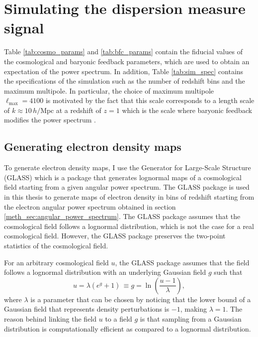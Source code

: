 \section{Simulating the dispersion measure signal} \label{meth_sec:sim_dm}
Table \ref{tab:cosmo_params} and \ref{tab:bfc_params} contain the fiducial values of the cosmological and baryonic feedback parameters, which are used to obtain an expectation of the power spectrum. In addition, Table \ref{tab:sim_spec} contains the specifications of the simulation such as the number of redshift bins and the maximum multipole. In particular, the choice of maximum multipole $\ell_\mathrm{max} = 4100$ is motivated by the fact that this scale corresponds to a length scale of $k \approx 10 \, h/\mathrm{Mpc}$ at a redshift of $z = 1$ which is the scale where baryonic feedback modifies the power spectrum \citep{Maraio_2025a}.

\subsection{Generating electron density maps}\label{meth_sec:glass}
To generate electron density maps, I use the Generator for Large-Scale Structure (GLASS) \citep{tessore2023glass} which is a package that generates lognormal maps of a cosmological field starting from a given angular power spectrum. The GLASS package is used in this thesis to generate maps of electron density in bins of redshift starting from the electron angular power spectrum obtained in section \ref{meth_sec:angular_power_spectrum}. The GLASS package assumes that the cosmological field follows a lognormal distribution, which is not the case for a real cosmological field. However, the GLASS package preserves the two-point statistics of the cosmological field.

For an arbitrary cosmological field $u$, the GLASS package assumes that the field follows a lognormal distribution with an underlying Gaussian field $g$ such that
\begin{equation}\label{eq:lognorma_gaussian}
    u = \lambda \left(e^g + 1\right)\,  \equiv g = \ln\left( \frac{u - 1}{\lambda} \right),
\end{equation}
where $\lambda$ is a parameter that can be chosen by noticing that the lower bound of a Gaussian field that represents density perturbations is $-1$, making $\lambda = 1$. The reason behind linking the field $u$ to a field $g$ is that sampling from a Gaussian distribution is computationally efficient as compared to a lognormal distribution.


